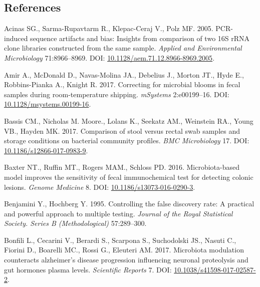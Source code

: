 \documentclass[11pt,]{article}
\begin{document}
\newpage

\subsection{References}\label{references}

\hypertarget{refs}{}
\hypertarget{ref-Acinas2005}{}
Acinas SG., Sarma-Rupavtarm R., Klepac-Ceraj V., Polz MF. 2005.
PCR-induced sequence artifacts and bias: Insights from comparison of two
16S rRNA clone libraries constructed from the same sample. \emph{Applied
and Environmental Microbiology} 71:8966--8969. DOI:
\href{https://doi.org/10.1128/aem.71.12.8966-8969.2005}{10.1128/aem.71.12.8966-8969.2005}.

\hypertarget{ref-Amir2017}{}
Amir A., McDonald D., Navas-Molina JA., Debelius J., Morton JT., Hyde
E., Robbins-Pianka A., Knight R. 2017. Correcting for microbial blooms
in fecal samples during room-temperature shipping. \emph{mSystems}
2:e00199--16. DOI:
\href{https://doi.org/10.1128/msystems.00199-16}{10.1128/msystems.00199-16}.

\hypertarget{ref-storage_Bassis_2017}{}
Bassis CM., Nicholas M. Moore., Lolans K., Seekatz AM., Weinstein RA.,
Young VB., Hayden MK. 2017. Comparison of stool versus rectal swab
samples and storage conditions on bacterial community profiles.
\emph{BMC Microbiology} 17. DOI:
\href{https://doi.org/10.1186/s12866-017-0983-9}{10.1186/s12866-017-0983-9}.

\hypertarget{ref-Baxter2016}{}
Baxter NT., Ruffin MT., Rogers MAM., Schloss PD. 2016. Microbiota-based
model improves the sensitivity of fecal immunochemical test for
detecting colonic lesions. \emph{Genome Medicine} 8. DOI:
\href{https://doi.org/10.1186/s13073-016-0290-3}{10.1186/s13073-016-0290-3}.

\hypertarget{ref-benjamini_controlling_1995}{}
Benjamini Y., Hochberg Y. 1995. Controlling the false discovery rate: A
practical and powerful approach to multiple testing. \emph{Journal of
the Royal Statistical Society. Series B (Methodological)} 57:289--300.

\hypertarget{ref-Bonfili2017}{}
Bonfili L., Cecarini V., Berardi S., Scarpona S., Suchodolski JS.,
Nasuti C., Fiorini D., Boarelli MC., Rossi G., Eleuteri AM. 2017.
Microbiota modulation counteracts alzheimer's disease progression
influencing neuronal proteolysis and gut hormones plasma levels.
\emph{Scientific Reports} 7. DOI:
\href{https://doi.org/10.1038/s41598-017-02587-2}{10.1038/s41598-017-02587-2}.
\end{document}
